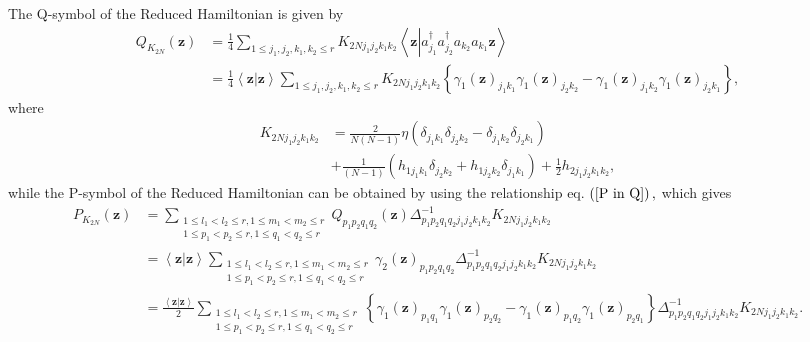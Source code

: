 \documentclass[aps,preprint]{revtex4}%
\begin{document}
The Q-symbol of the Reduced Hamiltonian is given by
\begin{align}
Q_{K_{2N}}\left(  \mathbf{z}\right)   &  =\frac{1}{4}\sum_{1\leq j_{1}%
,j_{2},k_{1},k_{2}\leq r}K_{2Nj_{1}j_{2}k_{1}k_{2}}\left\langle \mathbf{z}%
\left\vert a_{j_{1}}^{\dagger}a_{j_{2}}^{\dagger}a_{k_{2}}a_{k_{1}}%
\mathbf{z}\right.  \right\rangle \nonumber\\
&  =\frac{1}{4}\left\langle \mathbf{z}\left\vert \mathbf{z}\right.
\right\rangle \sum_{1\leq j_{1},j_{2},k_{1},k_{2}\leq r}K_{2Nj_{1}j_{2}%
k_{1}k_{2}}\left\{  \gamma_{1}\left(  \mathbf{z}\right)  _{j_{1}k_{1}}%
\gamma_{1}\left(  \mathbf{z}\right)  _{j_{2}k_{2}}-\gamma_{1}\left(
\mathbf{z}\right)  _{j_{1}k_{2}}\gamma_{1}\left(  \mathbf{z}\right)
_{j_{2}k_{1}}\right\}  ,
\end{align}
where%
\begin{align}
K_{2Nj_{1}j_{2}k_{1}k_{2}}  &  =\frac{2}{N\left(  N-1\right)  }\eta\left(
\delta_{j_{1}k_{1}}\delta_{j_{2}k_{2}}-\delta_{j_{1}k_{2}}\delta_{j_{2}k_{1}%
}\right) \nonumber\\
&  +\frac{1}{\left(  N-1\right)  }\left(  h_{1j_{1}k_{1}}\delta_{j_{2}k_{2}%
}+h_{1j_{2}k_{2}}\delta_{j_{1}k_{1}}\right)  +\frac{1}{2}h_{2j_{1}j_{2}%
k_{1}k_{2}},
\end{align}
while the P-symbol of the Reduced Hamiltonian can be obtained by using the
relationship eq. $\left(  \ref{P in Q}\right)  ,$ which gives
\begin{align}
P_{K_{2N}}\left(  \mathbf{z}\right)   &  =\sum_{\substack{1\leq l_{1}%
<l_{2}\leq r,1\leq m_{1}<m_{2}\leq r\\1\leq p_{1}<p_{2}\leq r,1\leq
q_{1}<q_{2}\leq r}}Q_{p_{1}p_{2}q_{1}q_{2}}\left(  \mathbf{z}\right)
\Delta_{p_{1}p_{2}q_{1}q_{2}j_{1}j_{2}k_{1}k_{2}}^{-1}K_{2Nj_{1}j_{2}%
k_{1}k_{2}}\\
&  =\left\langle \mathbf{z\left\vert \mathbf{z}\right.  }\right\rangle
\sum_{\substack{1\leq l_{1}<l_{2}\leq r,1\leq m_{1}<m_{2}\leq r\\1\leq
p_{1}<p_{2}\leq r,1\leq q_{1}<q_{2}\leq r}}\gamma_{2}\left(  \mathbf{z}%
\right)  _{p_{1}p_{2}q_{1}q_{2}}\Delta_{p_{1}p_{2}q_{1}q_{2}j_{1}j_{2}%
k_{1}k_{2}}^{-1}K_{2Nj_{1}j_{2}k_{1}k_{2}}\\
&  =\frac{\left\langle \mathbf{z\left\vert \mathbf{z}\right.  }\right\rangle
}{2}\sum_{\substack{1\leq l_{1}<l_{2}\leq r,1\leq m_{1}<m_{2}\leq r\\1\leq
p_{1}<p_{2}\leq r,1\leq q_{1}<q_{2}\leq r}}\left\{  \gamma_{1}\left(
\mathbf{z}\right)  _{p_{1}q_{1}}\gamma_{1}\left(  \mathbf{z}\right)
_{p_{2}q_{2}}-\gamma_{1}\left(  \mathbf{z}\right)  _{p_{1}q_{2}}\gamma
_{1}\left(  \mathbf{z}\right)  _{p_{2}q_{1}}\right\}  \Delta_{p_{1}p_{2}%
q_{1}q_{2}j_{1}j_{2}k_{1}k_{2}}^{-1}K_{2Nj_{1}j_{2}k_{1}k_{2}}.
\end{align}
\end{document}
